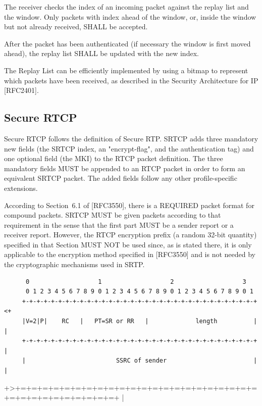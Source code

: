 \documentclass{article}
\begin{document}
The receiver checks the index of an incoming packet against the replay list and the window.  Only packets with index ahead of the window, or, inside the window but not already received, SHALL be accepted.

After the packet has been authenticated (if necessary the window is first moved ahead), the replay list SHALL be updated with the new index.

The Replay List can be efficiently implemented by using a bitmap to represent which packets have been received, as described in the Security Architecture for IP [RFC2401].

\subsection{Secure RTCP}

Secure RTCP follows the definition of Secure RTP.  SRTCP adds three mandatory new fields (the SRTCP index, an "encrypt-flag", and the authentication tag) and one optional field (the MKI) to the RTCP packet definition.  The three mandatory fields MUST be appended to an RTCP packet in order to form an equivalent SRTCP packet.  The added fields follow any other profile-specific extensions.

According to Section~6.1 of [RFC3550], there is a REQUIRED packet format for compound packets.  SRTCP MUST be given packets according to that requirement in the sense that the first part MUST be a sender report or a receiver report.  However, the RTCP encryption prefix (a random 32-bit quantity) specified in that Section MUST NOT be used since, as is stated there, it is only applicable to the encryption method specified in [RFC3550] and is not needed by the cryptographic mechanisms used in SRTP.

\begin{verbatim}
      0                   1                   2                   3
      0 1 2 3 4 5 6 7 8 9 0 1 2 3 4 5 6 7 8 9 0 1 2 3 4 5 6 7 8 9 0 1
     +-+-+-+-+-+-+-+-+-+-+-+-+-+-+-+-+-+-+-+-+-+-+-+-+-+-+-+-+-+-+-+-+<+
     |V=2|P|    RC   |   PT=SR or RR   |             length          | |
     +-+-+-+-+-+-+-+-+-+-+-+-+-+-+-+-+-+-+-+-+-+-+-+-+-+-+-+-+-+-+-+-+ |
     |                         SSRC of sender                        | |
\end{verbatim}

+>+=+=+=+=+=+=+=+=+=+=+=+=+=+=+=+=+=+=+=+=+=+=+=+=+=+=+=+=+=+=+=+=+ |
\end{document}
